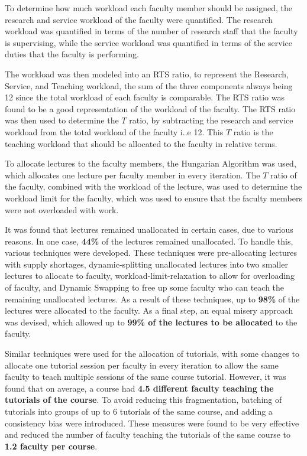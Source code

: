 To determine how much workload each faculty member should be assigned, the research and service workload of the faculty were quantified. The research workload was quantified in terms of the number of research staff that the faculty is supervising, while the service workload was quantified in terms of the service duties that the faculty is performing.

The workload was then modeled into an RTS ratio, to represent the Research, Service, and Teaching workload, the sum of the three components always being 12 since the total workload of each faculty is comparable. The RTS ratio was found to be a good representation of the workload of the faculty. The RTS ratio was then used to determine the $T$ ratio, by subtracting the research and service workload from the total workload of the faculty i..e 12. This $T$ ratio is the teaching workload that should be allocated to the faculty in relative terms.

To allocate lectures to the faculty members, the Hungarian Algorithm was used, which allocates one lecture per faculty member in every iteration. The $T$ ratio of the faculty, combined with the workload of the lecture, was used to determine the workload limit for the faculty, which was used to ensure that the faculty members were not overloaded with work.

It was found that lectures remained unallocated in certain cases, due to various reasons. In one case, \textbf{44\%} of the lectures remained unallocated. To handle this, various techniques were developed. These techniques were pre-allocating lectures with supply shortages, dynamic-splitting unallocated lectures into two smaller lectures to allocate to faculty, workload-limit-relaxation to allow for overloading of faculty, and Dynamic Swapping to free up some faculty who can teach the remaining unallocated lectures. As a result of these techniques, up to \textbf{98\%} of the lectures were allocated to the faculty. As a final step, an equal misery approach was devised, which allowed up to \textbf{99\% of the lectures to be allocated} to the faculty.

Similar techniques were used for the allocation of tutorials, with some changes to allocate one tutorial session per faculty in every iteration to allow the same faculty to teach multiple sessions of the same course tutorial. However, it was found that on average, a course had \textbf{4.5 different faculty teaching the tutorials of the course}. To avoid reducing this fragmentation, batching of tutorials into groups of up to 6 tutorials of the same course, and adding a consistency bias were introduced. These measures were found to be very effective and reduced the number of faculty teaching the tutorials of the same course to \textbf{1.2 faculty per course}.

